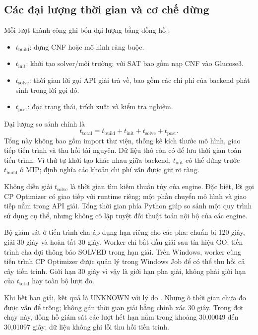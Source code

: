 \documentclass[a4paper,fleqn]{cas-sc}
\newcommand{\code}[1]{\texttt{\detokenize{#1}}}
\begin{document}
\subsection{Các đại lượng thời gian và cơ chế dừng}\label{sec:timing}
Mỗi lượt thành công ghi bốn đại lượng bằng đồng hồ \code{perf_counter}:
\begin{itemize}
\item $t_{\mathrm{build}}$: dựng CNF hoặc mô hình ràng buộc.
\item $t_{\mathrm{init}}$: khởi tạo solver/môi trường; với SAT bao gồm nạp CNF vào Glucose3.
\item $t_{\mathrm{solve}}$: thời gian lời gọi API giải trả về, bao gồm các chi phí của backend phát sinh trong lời gọi đó.
\item $t_{\mathrm{post}}$: đọc trạng thái, trích xuất và kiểm tra nghiệm.
\end{itemize}
Đại lượng so sánh chính là
\begin{equation}\label{eq:total}
 t_{\mathrm{total}}=t_{\mathrm{build}}+t_{\mathrm{init}}+t_{\mathrm{solve}}+t_{\mathrm{post}}.
\end{equation}
Tổng này không bao gồm import thư viện, thống kê kích thước mô hình, giao tiếp tiến trình và thu hồi tài nguyên. Dữ liệu thô còn có \code{process_wall_s} để lưu thời gian toàn tiến trình. Vì thứ tự khởi tạo khác nhau giữa backend, $t_{\mathrm{init}}$ có thể đứng trước $t_{\mathrm{build}}$ ở MIP; định nghĩa các khoản chi phí vẫn được giữ rõ ràng.

Không diễn giải $t_{\mathrm{solve}}$ là thời gian tìm kiếm thuần túy của engine. Đặc biệt, lời gọi CP Optimizer có giao tiếp với runtime riêng; một phần chuyển mô hình và giao tiếp nằm trong API giải. Tổng thời gian phía Python giúp so sánh một quy trình sử dụng cụ thể, nhưng không cô lập tuyệt đối thuật toán nội bộ của các engine.

Bộ giám sát ở tiến trình cha áp dụng hạn riêng cho các pha: chuẩn bị 120 giây, giải 30 giây và hoàn tất 30 giây. Worker chỉ bắt đầu giải sau tín hiệu GO; tiến trình cha đợi thông báo SOLVED trong hạn giải. Trên Windows, worker cùng tiến trình CP Optimizer được quản lý trong Windows Job để có thể thu hồi cả cây tiến trình. Giới hạn 30 giây vì vậy là giới hạn pha giải, không phải giới hạn của $t_{\mathrm{total}}$ hay toàn bộ lượt đo.

Khi hết hạn giải, kết quả là UNKNOWN với lý do \code{solve_timeout}. Những ô thời gian chưa đo được vẫn để trống; không gán thời gian giải bằng chính xác 30 giây. Trong đợt chạy này, đồng hồ giám sát các lượt hết hạn nằm trong khoảng 30,00049 đến 30,01097 giây; dữ liệu không ghi lỗi thu hồi tiến trình.
\end{document}
